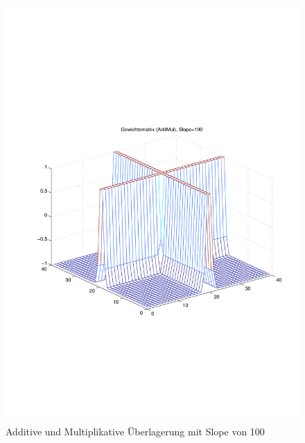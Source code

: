 \begin{figure}[hbt]
	\centering
	\includegraphics[width=0.6\linewidth]{./Bilder/Auswertung/Gewichtsmatrix/Gewichtsmatrix_AddMul_Slope_100}
	\caption{Additive und Multiplikative Überlagerung mit Slope von 100}
	\label{AddMul100}
\end{figure}

\newpage
